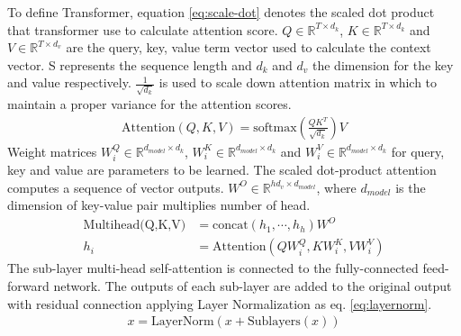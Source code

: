 To define Transformer, equation \ref{eq:scale-dot} denotes the scaled dot product that transformer use to calculate attention score. $ Q\in\mathbb{R}^{T\times d_k} $,  $ K\in\mathbb{R}^{T\times d_k} $ and $ V\in\mathbb{R}^{T\times d_v} $ are the query, key, value term vector used to calculate the context vector. S represents the sequence length and $ d_k $ and $ d_v $ the dimension for the key and value respectively. $ \frac{1}{\sqrt{d_k}} $ is used to scale down attention matrix in which to maintain a proper variance for the attention scores.
\begin{align}\label{eq:scale-dot}
\text{Attention}(Q,K,V) = \text{softmax}\left(\frac{QK^T}{\sqrt{d_k}}\right)V
\end{align}
Weight matrices $ W_i^Q\in\mathbb{R}^{d_{model}\times d_k} $, $ W_i^K\in\mathbb{R}^{d_{model}\times d_k} $ and $ W_	i^V\in\mathbb{R}^{d_{model}\times d_k} $  for query, key and value are parameters to be learned. The scaled dot-product attention computes a sequence of vector outputs. $ W^O\in\mathbb{R}^{hd_v\times d_{model}} $, where $ d_{model} $ is the dimension of key-value pair multiplies number of head.
\begin{align}
\text{Multihead(Q,K,V)}&=\text{concat}(h_1,\cdots,h_h)W^O\\
h_i&=\text{Attention}(QW_i^Q,KW_i^K,VW_i^V)
\end{align}
The sub-layer multi-head self-attention is connected to the fully-connected feed-forward network. The outputs of each sub-layer are added to the original output with residual connection applying Layer Normalization as eq. \ref{eq:layernorm}.
\begin{align}\label{eq:layernorm}
x=\text{LayerNorm}(x+\text{Sublayers}(x))
\end{align}
%
%

